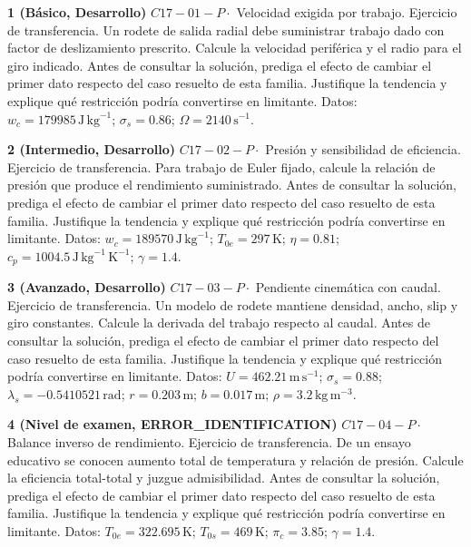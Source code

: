 \documentclass[10pt,openany]{book}
\begin{document}
\begin{tcolorbox}[title={Ejercicios propuestos}, studiumworked, breakable]

\noindent\textbf{1 (Básico, Desarrollo)}
\(C17-01-P \cdot\) Velocidad exigida por trabajo. Ejercicio de transferencia. Un rodete de salida radial debe suministrar trabajo dado con factor de deslizamiento prescrito. Calcule la velocidad periférica y el radio para el giro indicado. Antes de consultar la solución, prediga el efecto de cambiar el primer dato respecto del caso resuelto de esta familia. Justifique la tendencia y explique qué restricción podría convertirse en limitante. Datos: \(w_c=179985\, \mathrm{J}\,\mathrm{kg}^{-1}\); \(\sigma_s=0.86\); \(\Omega=2140\, \mathrm{s}^{-1}\).

\noindent\textbf{2 (Intermedio, Desarrollo)}
\(C17-02-P \cdot\) Presión y sensibilidad de eficiencia. Ejercicio de transferencia. Para trabajo de Euler fijado, calcule la relación de presión que produce el rendimiento suministrado. Antes de consultar la solución, prediga el efecto de cambiar el primer dato respecto del caso resuelto de esta familia. Justifique la tendencia y explique qué restricción podría convertirse en limitante. Datos: \(w_c=189570\, \mathrm{J}\,\mathrm{kg}^{-1}\); \(T_{0e}=297\, \mathrm{K}\); \(\eta=0.81\); \(c_p=1004.5\, \mathrm{J}\,\mathrm{kg}^{-1}\,\mathrm{K}^{-1}\); \(\gamma=1.4\).

\noindent\textbf{3 (Avanzado, Desarrollo)}
\(C17-03-P \cdot\) Pendiente cinemática con caudal. Ejercicio de transferencia. Un modelo de rodete mantiene densidad, ancho, slip y giro constantes. Calcule la derivada del trabajo respecto al caudal. Antes de consultar la solución, prediga el efecto de cambiar el primer dato respecto del caso resuelto de esta familia. Justifique la tendencia y explique qué restricción podría convertirse en limitante. Datos: \(U=462.21\, \mathrm{m}\,\mathrm{s}^{-1}\); \(\sigma_s=0.88\); \(\lambda_s=-0.5410521\, \mathrm{rad}\); \(r=0.203\, \mathrm{m}\); \(b=0.017\, \mathrm{m}\); \(\rho=3.2\, \mathrm{kg}\,\mathrm{m}^{-3}\).

\noindent\textbf{4 (Nivel de examen, ERROR\_IDENTIFICATION)}
\(C17-04-P \cdot\) Balance inverso de rendimiento. Ejercicio de transferencia. De un ensayo educativo se conocen aumento total de temperatura y relación de presión. Calcule la eficiencia total-total y juzgue admisibilidad. Antes de consultar la solución, prediga el efecto de cambiar el primer dato respecto del caso resuelto de esta familia. Justifique la tendencia y explique qué restricción podría convertirse en limitante. Datos: \(T_{0e}=322.695\, \mathrm{K}\); \(T_{0s}=469\, \mathrm{K}\); \(\pi_c=3.85\); \(\gamma=1.4\).
\end{tcolorbox}
\end{document}
